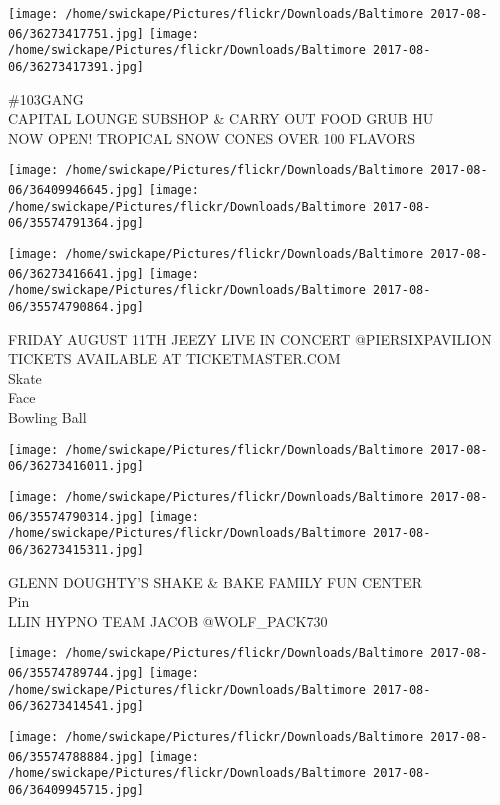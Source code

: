 \documentclass[10pt,letterpaper]{article}
\begin{document}
\vspace{0.25in}
\texttt{[image: /home/swickape/Pictures/flickr/Downloads/Baltimore 2017-08-06/36273417751.jpg]}
\texttt{[image: /home/swickape/Pictures/flickr/Downloads/Baltimore 2017-08-06/36273417391.jpg]}

\#103GANG\\
CAPITAL LOUNGE SUBSHOP \& CARRY OUT FOOD GRUB HU\\
NOW OPEN!  TROPICAL SNOW CONES OVER 100 FLAVORS\\
\pagebreak

\texttt{[image: /home/swickape/Pictures/flickr/Downloads/Baltimore 2017-08-06/36409946645.jpg]}
\texttt{[image: /home/swickape/Pictures/flickr/Downloads/Baltimore 2017-08-06/35574791364.jpg]}

\texttt{[image: /home/swickape/Pictures/flickr/Downloads/Baltimore 2017-08-06/36273416641.jpg]}
\texttt{[image: /home/swickape/Pictures/flickr/Downloads/Baltimore 2017-08-06/35574790864.jpg]}

FRIDAY AUGUST 11TH JEEZY LIVE IN CONCERT @PIERSIXPAVILION TICKETS AVAILABLE AT TICKETMASTER.COM\\
Skate\\
Face\\
Bowling Ball\\
\pagebreak

\texttt{[image: /home/swickape/Pictures/flickr/Downloads/Baltimore 2017-08-06/36273416011.jpg]}

\vspace{0.25in}
\texttt{[image: /home/swickape/Pictures/flickr/Downloads/Baltimore 2017-08-06/35574790314.jpg]}
\texttt{[image: /home/swickape/Pictures/flickr/Downloads/Baltimore 2017-08-06/36273415311.jpg]}

GLENN DOUGHTY'S SHAKE \& BAKE FAMILY FUN CENTER\\
Pin\\
LLIN HYPNO TEAM JACOB @WOLF\_PACK730\\
\pagebreak

\texttt{[image: /home/swickape/Pictures/flickr/Downloads/Baltimore 2017-08-06/35574789744.jpg]}
\texttt{[image: /home/swickape/Pictures/flickr/Downloads/Baltimore 2017-08-06/36273414541.jpg]}

\texttt{[image: /home/swickape/Pictures/flickr/Downloads/Baltimore 2017-08-06/35574788884.jpg]}
\texttt{[image: /home/swickape/Pictures/flickr/Downloads/Baltimore 2017-08-06/36409945715.jpg]}
\end{document}
